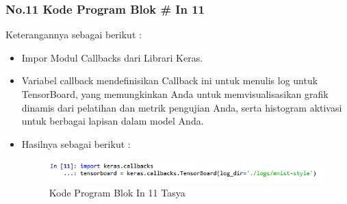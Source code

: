 \subsubsection{No.11 Kode Program Blok \# In 11}

Keterangannya sebagai berikut :\\
\begin{itemize}
\item Impor Modul Callbacks dari Librari Keras.
\item Variabel callback mendefinisikan Callback ini untuk menulis log untuk TensorBoard, yang memungkinkan Anda untuk memvisualisasikan grafik dinamis dari pelatihan dan metrik pengujian Anda, serta histogram aktivasi untuk berbagai lapisan dalam model Anda.
\item Hasilnya sebagai berikut : \\
\begin{figure}[ht]
\centering
\includegraphics[scale=0.5]{figures/Chapter 7/1164086/Praktek/chapter7tasya24.png}
\caption{Kode Program Blok In 11 Tasya}
\label{Praktek}
\end{figure}
\end{itemize}

